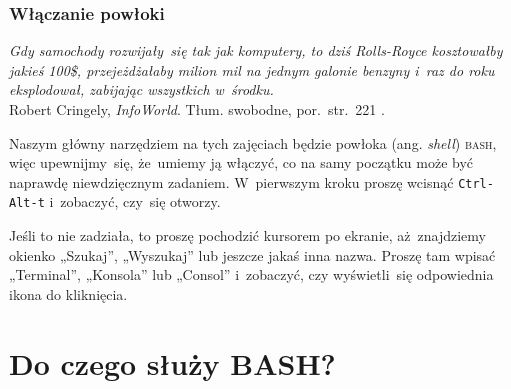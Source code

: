 \documentclass[10pt,t]{beamer}
\begin{document}
\begin{frame}
  \frametitle{Włączanie powłoki}


  \textit{Gdy samochody rozwijały~się tak jak komputery, to dziś
    Rolls-Royce kosztowałby jakieś 100\$, przejeżdżałaby milion mil na
    jednym galonie benzyny i~raz do roku eksplodował, zabijając wszystkich
    w~środku.} \\
  Robert Cringely, \textit{InfoWorld}. Tłum. swobodne, por.~str.~221
  \parencite{Garfinkel-Weise-Strassmann-The-UNIX-HATERS-Handbook-Pub-1994}.

  Naszym główny narzędziem na tych zajęciach będzie powłoka
  (ang. \textit{shell}) \textsc{bash}, więc upewnijmy~się, że~umiemy ją
  włączyć, co na samy początku może być naprawdę niewdzięcznym zadaniem.
  W~pierwszym kroku proszę wcisnąć \texttt{Ctrl-Alt-t} i~zobaczyć, czy~się
  otworzy.

  Jeśli to nie zadziała, to proszę pochodzić kursorem po ekranie,
  aż~znajdziemy okienko „Szukaj”, „Wyszukaj” lub jeszcze jakaś inna nazwa.
  Proszę tam wpisać „Terminal”, „Konsola” lub „Consol” i~zobaczyć, czy
  wyświetli~się odpowiednia ikona do kliknięcia.


\end{frame}










\section{Do czego służy BASH?}
\end{document}
